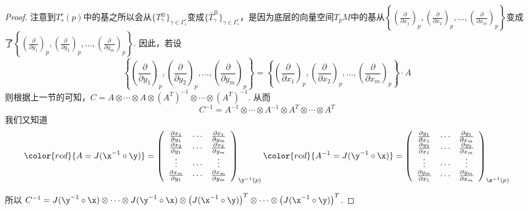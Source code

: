 \begin{proof}
	注意到$T^{r}_{s}(p)$中的基之所以会从$\{T^{\otimes}_{\gamma}\}_{\gamma\in \Gamma^{r}_{s}}$变成$\{\overline{T}^{\otimes}_{\gamma}\}_{\gamma\in \Gamma^{r}_{s}}$，是因为底层的向量空间$T_{p}M$中的基从$\left\{ \left( \frac { \partial } { \partial x _ { 1 } } \right) _ { p },\left( \frac { \partial } { \partial x _ { 2 } } \right) _ { p } , \dots , \left( \frac { \partial } { \partial x _ { m } } \right) _ { p } \right\}$变成了$\left\{ \left( \frac { \partial } { \partial y _ { 1 } } \right) _ { p },\left( \frac { \partial } { \partial y _ { 2 } } \right) _ { p } , \dots , \left( \frac { \partial } { \partial y _ { m } } \right) _ { p } \right\}$. 因此，若设
	\[
	\left\{ \left( \frac { \partial } { \partial y _ { 1 } } \right) _ { p },\left( \frac { \partial } { \partial y _ { 2 } } \right) _ { p } , \dots , \left( \frac { \partial } { \partial y _ { m } } \right) _ { p } \right\}=\left\{ \left( \frac { \partial } { \partial x _ { 1 } } \right) _ { p },\left( \frac { \partial } { \partial x _ { 2 } } \right) _ { p } , \dots , \left( \frac { \partial } { \partial x _ { m } } \right) _ { p } \right\}\cdot A
	\]
	则根据上一节的可知，$C=A\otimes\cdots\otimes A\otimes (A^{T})^{-1}\otimes\cdots\otimes (A^{T})^{-1}$. 从而
	\[
	C^{-1}=A^{-1}\otimes \cdots\otimes A^{-1}\otimes A^{T}\otimes\cdots \otimes A^{T}
	\]
	我们又知道
	\[
	{\color{red}{A=J(\x^{-1}\circ\y)}}=\left( \begin{array}{ccc}{\frac { \partial x_{1} } { \partial y _ { 1 } } }  & {\cdots} & {\frac { \partial x_{1} } { \partial y _ { m } } } \\ {\frac { \partial x_{2} } { \partial y _ { 1 } } }  & {\cdots} & {\frac { \partial x_{2} } { \partial y _ { m } } } \\ {\vdots}  & { \cdots} & {\vdots} \\ {\frac { \partial x_{m} } { \partial y _ { 1 } } }  & {\cdots} & {\frac { \partial x_{m} } { \partial y _ { m } } }\end{array}\right)_{\y^{-1}(p)}{\color{red}{A^{-1}=J(\y^{-1}\circ\x)}}=\left( \begin{array}{ccc}{\frac { \partial y_{1} } { \partial x _ { 1 } } }  & {\cdots} & {\frac { \partial y_{1} } { \partial x _ { m } } } \\ {\frac { \partial y_{2} } { \partial x _ { 1 } } }  & {\cdots} & {\frac { \partial y_{2} } { \partial x _ { m } } } \\ {\vdots}  & {\cdots } & {\vdots} \\ {\frac { \partial y_{m} } { \partial x _ { 1 } } }  & {\cdots} & {\frac { \partial y_{m} } { \partial x _ { m } } }\end{array}\right)_{\x^{-1}(p)}
	\]
	
	所以
	$
	C^{-1}=J(\y^{-1}\circ\x)\otimes \cdots\otimes J(\y^{-1}\circ\x)\otimes \left(J(\x^{-1}\circ\y) \right)^{T}\otimes\cdots \otimes \left(J(\x^{-1}\circ\y)\right)^{T}
	$.
\end{proof}

